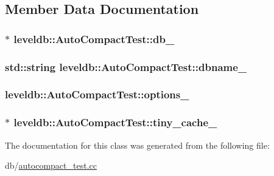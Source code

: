 \subsection{Member Data Documentation}
\hypertarget{classleveldb_1_1_auto_compact_test_a9e8d5f9bf0546b7d7fdf2128c66d8761}{
\subsubsection[{db\-\_\-}]{$\ast$ leveldb\-::\-Auto\-Compact\-Test\-::db\-\_\-}}\label{classleveldb_1_1_auto_compact_test_a9e8d5f9bf0546b7d7fdf2128c66d8761}
\hypertarget{classleveldb_1_1_auto_compact_test_a9caaa257e508397f94fbe646893b7b3b}{
\subsubsection[{dbname\-\_\-}]{\setlength{\rightskip}{0pt plus 5cm}std\-::string leveldb\-::\-Auto\-Compact\-Test\-::dbname\-\_\-}}\label{classleveldb_1_1_auto_compact_test_a9caaa257e508397f94fbe646893b7b3b}
\hypertarget{classleveldb_1_1_auto_compact_test_ad7f1f35214065627e4cadd0468d22c21}{
\subsubsection[{options\-\_\-}]{ leveldb\-::\-Auto\-Compact\-Test\-::options\-\_\-}}\label{classleveldb_1_1_auto_compact_test_ad7f1f35214065627e4cadd0468d22c21}
\hypertarget{classleveldb_1_1_auto_compact_test_a189cb5733d861b7df8c3bf945180afe5}{
\subsubsection[{tiny\-\_\-cache\-\_\-}]{$\ast$ leveldb\-::\-Auto\-Compact\-Test\-::tiny\-\_\-cache\-\_\-}}\label{classleveldb_1_1_auto_compact_test_a189cb5733d861b7df8c3bf945180afe5}


The documentation for this class was generated from the following file\-:\begin{DoxyCompactItemize}
\item 
db/\hyperlink{autocompact__test_8cc}{autocompact\-\_\-test.\-cc}\end{DoxyCompactItemize}
